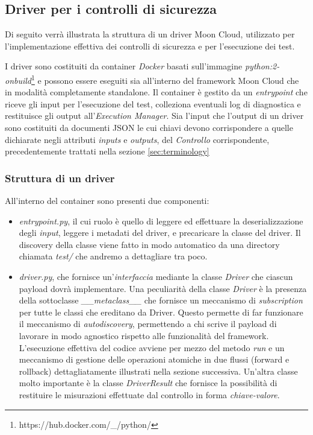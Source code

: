 \documentclass[../main.tex]{subfiles}
\begin{document}
\subsection{Driver per i controlli di sicurezza}
Di seguito verrà illustrata la struttura di un driver Moon Cloud, utilizzato per l'implementazione effettiva dei controlli di sicurezza e per l'esecuzione dei test.

I driver sono costituiti da container \textit{Docker} basati sull'immagine \textit{python:2-onbuild}\footnote{https://hub.docker.com/\_/python/} e possono essere eseguiti sia all'interno del framework Moon Cloud che in modalità completamente standalone.
Il container è gestito da un \textit{entrypoint} che riceve gli input per l'esecuzione del test, colleziona eventuali log di diagnostica e restituisce gli output all'\textit{Execution Manager}.
Sia l'input che l'output di un driver sono costituiti da documenti JSON le cui chiavi devono corrispondere a quelle dichiarate negli attributi \textit{inputs} e \textit{outputs}, del \textit{Controllo} corrispondente, precedentemente trattati nella sezione \ref{sec:terminology}
\subsubsection{Struttura di un driver}
\label{subsec:strutturadriver}
All'interno del container sono presenti due componenti:
\begin{itemize}
    \item{\textit{entrypoint.py}}, il cui ruolo è quello di leggere ed effettuare la deserializzazione degli \textit{input}, leggere i metadati del driver, e precaricare la classe del driver.
        Il discovery della classe viene fatto in modo automatico da una directory chiamata \textit{test/} che andremo a dettagliare tra poco.
    \item{\textit{driver.py}}, che fornisce un'\textit{interfaccia} mediante la classe \textit{Driver} che ciascun payload dovrà implementare.
        Una peculiarità della classe \textit{Driver} è la presenza della sottoclasse \textit{\_\_metaclass\_\_} che fornisce un meccanismo di \textit{subscription} per tutte le classi che ereditano da Driver. Questo permette di far funzionare il meccanismo di \textit{autodiscovery}, permettendo a chi scrive il payload di lavorare in modo agnostico rispetto alle funzionalità del framework.
        L'esecuzione effettiva del codice avviene per mezzo del metodo \textit{run} e un meccanismo di gestione delle operazioni atomiche in due flussi (forward e rollback) dettagliatamente illustrati nella sezione successiva.
        Un'altra classe molto importante è la classe \textit{DriverResult} che fornisce la possibilità di restituire le misurazioni effettuate dal controllo in forma \textit{chiave-valore}.
\end{itemize}
\end{document}
